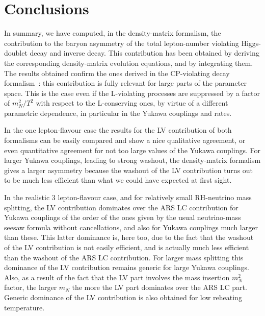 \documentclass[prd,twocolumn,superscriptaddress,preprintnumbers,nofootinbib,
noshowpacs,groupedaddress]{revtex4-1} %
\begin{document}
\section{Conclusions}

In summary, we have computed, in the density-matrix formalism, the contribution to the baryon asymmetry of the total lepton-number violating Higgs-doublet decay and inverse decay. This contribution has been obtained by deriving the corresponding density-matrix evolution equations, and by integrating them. The results obtained confirm the ones derived in the CP-violating decay formalism~\cite{Hambye:2016sby}: this contribution is fully 
relevant for large parts of the parameter space. This is the case even if the L-violating processes are suppressed by a factor of $m^2_N/T^2$ with respect to the L-conserving ones, by virtue of a different parametric dependence, in particular in the Yukawa couplings and rates.

In the one lepton-flavour case the results for the LV contribution of both formalisms can be easily compared and show a nice qualitative agreement, or even quantitative agreement for not too large values of the Yukawa couplings. For larger Yukawa couplings, leading to strong washout, the density-matrix formalism gives a larger asymmetry because the washout of the LV contribution turns out to be much less efficient than what we could have expected at first sight.

In the realistic 3 lepton-flavour case, and for relatively small RH-neutrino mass splitting, the LV contribution dominates over the ARS LC contribution for Yukawa couplings of the order of the ones given by the usual neutrino-mass seesaw formula without cancellations, and also for  Yukawa couplings much larger than these. This latter dominance is, here too, due to the fact that the washout of the LV contribution is not easily efficient, and is actually much less efficient than the washout of the ARS LC contribution.
For larger mass splitting this dominance of the LV contribution remains generic for large Yukawa couplings. Also, as a result of the fact that the LV part involves the mass insertion $m_N^2$ factor, the larger $m_N$ the more the LV part dominates over the ARS LC part. Generic dominance of the LV contribution is also obtained for low reheating temperature. 
\end{document}
